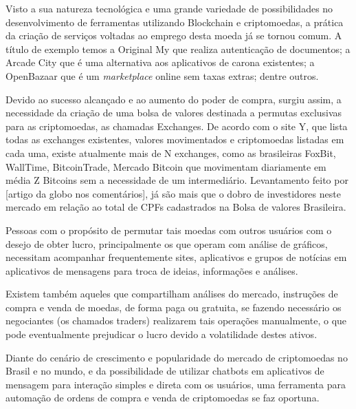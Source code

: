 
Visto a sua natureza tecnológica e uma grande variedade de possibilidades no desenvolvimento de ferramentas utilizando Blockchain e criptomoedas, a prática da criação de serviços voltadas ao emprego desta moeda já se tornou comum. A título de exemplo temos a Original My que realiza autenticação de documentos; a Arcade City que é uma alternativa aos aplicativos de carona existentes; a OpenBazaar que é um \textit{marketplace} online sem taxas extras; dentre outros. 

Devido ao sucesso alcançado e ao aumento do poder de compra, surgiu assim, a necessidade da criação de uma bolsa de valores destinada a permutas exclusivas para as criptomoedas, as chamadas Exchanges. De acordo com o site Y, que lista todas as exchanges existentes, valores movimentados e criptomoedas listadas em cada uma, existe atualmente mais de N exchanges, como as brasileiras FoxBit, WallTime, BitcoinTrade, Mercado Bitcoin que movimentam diariamente em média Z Bitcoins sem a necessidade de um intermediário. Levantamento feito por [artigo da globo nos comentários], já são mais que o dobro de investidores neste mercado em relação ao total de CPFs cadastrados na Bolsa de valores Brasileira. 

Pessoas com o propósito de permutar tais moedas com outros usuários com o desejo de obter lucro, principalmente os que operam com análise de gráficos, necessitam acompanhar frequentemente sites, aplicativos e grupos de notícias em aplicativos de mensagens para troca de ideias, informações e análises. 

Existem também aqueles que compartilham análises do mercado, instruções de compra e venda de moedas, de forma paga ou gratuita, se fazendo necessário os negociantes (os chamados traders) realizarem tais operações manualmente, o que pode eventualmente prejudicar o lucro devido a volatilidade destes ativos.

Diante do cenário de crescimento e popularidade do mercado de criptomoedas no Brasil e no mundo, e da possibilidade de utilizar chatbots em aplicativos de mensagem para interação simples e direta com os usuários, uma ferramenta para automação de ordens de compra e venda de criptomoedas se faz oportuna.


